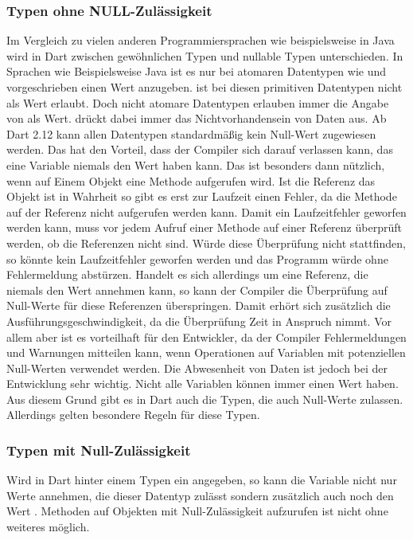 \subsubsection{Typen ohne NULL-Zulässigkeit} Im Vergleich zu vielen anderen Programmiersprachen wie beispielsweise in Java wird in Dart zwischen gewöhnlichen Typen und nullable Typen unterschieden. In Sprachen wie Beispielsweise Java ist es nur bei atomaren Datentypen wie  und  vorgeschrieben einen Wert anzugeben.  ist bei diesen primitiven Datentypen nicht als Wert erlaubt. Doch nicht atomare Datentypen erlauben immer die Angabe von  als Wert.  drückt dabei immer das Nichtvorhandensein von Daten aus. Ab Dart 2.12   kann allen Datentypen standardmäßig kein Null-Wert zugewiesen werden. Das hat den Vorteil, dass der Compiler sich darauf verlassen kann, das eine Variable niemals den Wert  haben kann. Das ist besonders dann nützlich, wenn auf  Einem Objekt eine Methode aufgerufen wird. Ist die Referenz das Objekt ist in Wahrheit  so gibt es erst zur Laufzeit einen Fehler, da die Methode auf der Referenz  nicht aufgerufen werden kann. Damit ein Laufzeitfehler geworfen werden kann, muss vor jedem Aufruf einer Methode auf einer Referenz überprüft werden, ob die Referenzen nicht  sind. Würde diese Überprüfung nicht stattfinden, so könnte kein Laufzeitfehler geworfen werden und das Programm würde ohne Fehlermeldung abstürzen. Handelt es sich allerdings um eine Referenz, die niemals den Wert  annehmen kann, so kann der Compiler die Überprüfung auf Null-Werte für diese Referenzen überspringen. Damit erhört sich zusätzlich die Ausführungsgeschwindigkeit, da die Überprüfung Zeit in Anspruch nimmt. Vor allem aber ist es vorteilhaft für den Entwickler, da der Compiler  Fehlermeldungen und Warnungen mitteilen kann, wenn Operationen auf Variablen mit potenziellen Null-Werten verwendet werden. Die Abwesenheit von Daten ist jedoch bei der Entwicklung sehr wichtig. Nicht alle Variablen können immer einen Wert haben. Aus diesem Grund gibt es in Dart auch die Typen, die auch Null-Werte zulassen. Allerdings gelten besondere Regeln für diese Typen.

\subsubsection{Typen mit Null-Zulässigkeit}

Wird in Dart hinter einem Typen ein  angegeben, so kann die Variable nicht nur  Werte annehmen, die dieser Datentyp zulässt sondern zusätzlich auch noch den Wert . Methoden auf Objekten mit Null-Zulässigkeit aufzurufen ist nicht ohne weiteres möglich.


